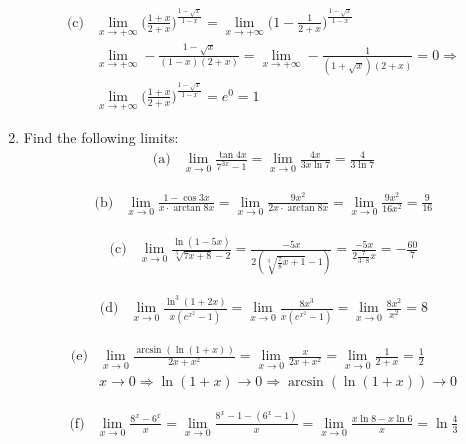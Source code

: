 \documentclass{article}
\begin{document}
\begin{enumerate}
\begin{align*}
\text{(c)} &\lim_{x \to +\infty} \bigg(\frac{1+x}{2+x}\bigg)^{\frac{1-\sqrt{x}}{1-x}} = \lim_{x \to +\infty} \bigg(1 - \frac{1}{2+x}\bigg)^{\frac{1-\sqrt{x}}{1-x}}\\
&\lim_{x \to +\infty} - \frac{1-\sqrt{x}}{(1-x)(2+x)} = \lim_{x \to +\infty} - \frac{1}{(1+\sqrt{x})(2+x)} = 0 \Rightarrow\\
&\lim_{x \to +\infty} \bigg(\frac{1+x}{2+x}\bigg)^{\frac{1-\sqrt{x}}{1-x}} = e^0 = 1
\end{align*}

\item Find the following limits:
\begin{align*}
\text{(a)} &\lim_{x \to 0} \frac{\tan{4x}}{7^{3x}-1} = \lim_{x \to 0} \frac{4x}{3x\ln{7}} = \frac{4}{3\ln{7}}
\end{align*}

\begin{align*}
\text{(b)} &\lim_{x \to 0} \frac{1-\cos{3x}}{x \cdot \arctan{8x}} = \lim_{x \to 0} \frac{9x^2}{2x \cdot \arctan{8x}} = \lim_{x \to 0} \frac{9x^2}{16x^2} = \frac{9}{16}
\end{align*}

\begin{align*}
\text{(c)} &\lim_{x \to 0} \frac{\ln{(1-5x)}}{\sqrt[3]{7x+8}-2} = \frac{-5x}{2(\sqrt[3]{\frac{7}{8}x+1}-1)} = \frac{-5x}{2\frac{7}{3\cdot8}x} = -\frac{60}{7}
\end{align*}

\begin{align*}
\text{(d)} &\lim_{x \to 0} \frac{\ln^3{(1+2x)}}{x(e^{x^2}-1)} = \lim_{x \to 0} \frac{8x^3}{x(e^{x^2}-1)} = \lim_{x \to 0} \frac{8x^2}{x^2} = 8 
\end{align*}

\begin{align*}
\text{(e)} &\lim_{x \to 0} \frac{\arcsin{(\ln{(1+x)})}}{2x+x^2} = \lim_{x \to 0} \frac{x}{2x+x^2} = \lim_{x \to 0} \frac{1}{2 + x} = \frac{1}{2}\\
&x \to 0 \Rightarrow \ln{(1+x)} \to 0 \Rightarrow \arcsin{(\ln{(1+x)})} \to 0
\end{align*}

\begin{align*}
\text{(f)} &\lim_{x \to 0} \frac{8^x - 6^x}{x} = \lim_{x \to 0} \frac{8^x - 1 - (6^x - 1)}{x} = \lim_{x \to 0} \frac{x\ln{8} - x\ln{6}}{x} = \ln{\frac{4}{3}}
\end{align*}

\end{enumerate}
\end{document}
